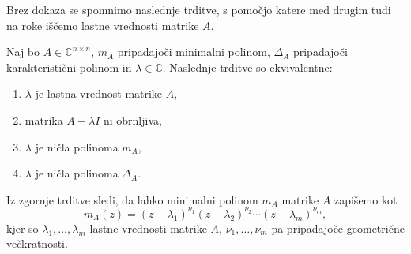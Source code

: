 \documentclass[mat1]{fmfdelo}
\newcommand{\C}{\mathbb C}
\begin{document}
Brez dokaza se spomnimo naslednje trditve, s pomočjo katere med drugim tudi na roke iščemo lastne vrednosti matrike $A$.
\begin{trditev}
    Naj bo $A \in \C^{n \times n}$, $m_A$ pripadajoči minimalni polinom, $\Delta_A$ pripadajoči karakteristični polinom in $\lambda \in \C$. Naslednje trditve so ekvivalentne:
    \begin{enumerate}
        \item $\lambda$ je lastna vrednost matrike $A$,
        \item matrika $A- \lambda I$ ni obrnljiva,
        \item $\lambda$ je ničla polinoma $m_A$,
        \item $\lambda$ je ničla polinoma $\Delta_A$.
    \end{enumerate}
\end{trditev}

Iz zgornje trditve sledi, da lahko minimalni polinom $m_A$ matrike $A$ zapišemo kot
\begin{equation*}
    m_A(z) = \left(z-\lambda_1\right)^{\nu_1}\left(z-\lambda_2\right)^{\nu_2}\cdots \left(z-\lambda_m\right)^{\nu_m},
\end{equation*}
kjer so $\lambda_1, \ldots, \lambda_m$ lastne vrednosti matrike $A$, $\nu_1, \ldots, \nu_m$ pa pripadajoče geometrične večkratnosti.
\end{document}
